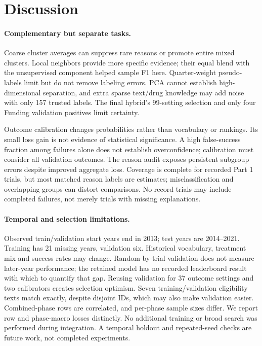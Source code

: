 \documentclass[10pt,twocolumn,letterpaper]{article}
\begin{document}
\section{Discussion}
\paragraph{Complementary but separate tasks.}
Coarse cluster averages can suppress rare reasons or promote entire mixed
clusters. Local neighbors provide more specific evidence; their equal blend
with the unsupervised component helped sample F1 here. Quarter-weight pseudo-labels
limit but do not remove labeling errors. PCA cannot establish high-dimensional
separation, and extra sparse text/drug knowledge may add noise with only 157
trusted labels. The final hybrid's 99-setting selection and only four Funding
validation positives limit certainty.

Outcome calibration changes probabilities rather than vocabulary or rankings.
Its small loss gain is not evidence of statistical significance. A high
false-success fraction among failures alone does not establish overconfidence;
calibration must consider all validation outcomes. The reason audit exposes
persistent subgroup errors despite improved aggregate loss. Coverage is complete
for recorded Part 1 trials, but most matched reason labels are estimates;
misclassification and overlapping groups can distort comparisons. No-record
trials may include completed failures, not merely trials with missing explanations.

\paragraph{Temporal and selection limitations.}
Observed train/validation start years end in 2013; test years are 2014--2021.
Training has 21 missing years, validation six. Historical vocabulary, treatment
mix and success rates may change. Random-by-trial validation does not measure
later-year performance; the retained model has no recorded leaderboard result
with which to quantify that gap. Reusing validation for 37 outcome settings and
two calibrators creates selection optimism. Seven training/validation eligibility
texts match exactly, despite disjoint IDs, which may also make validation easier.
Combined-phase rows are correlated, and per-phase sample sizes differ. We report
row and phase-macro losses distinctly. No additional training or broad search
was performed during integration. A temporal holdout and repeated-seed checks
are future work, not completed experiments.
\end{document}
